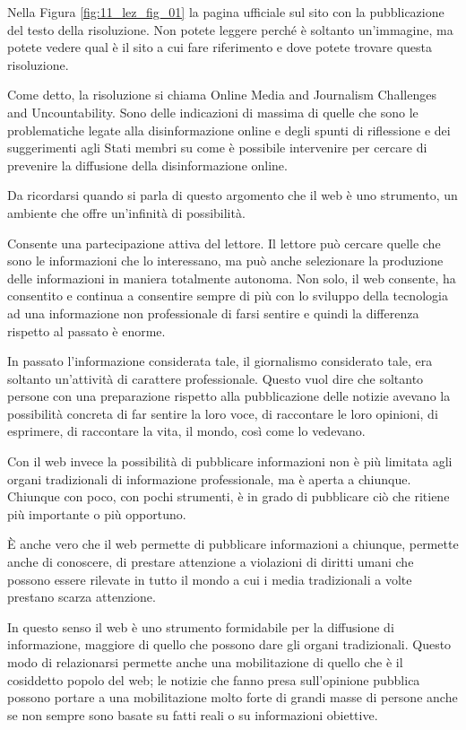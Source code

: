 Nella Figura \ref{fig:11_lez_fig_01} la pagina ufficiale sul sito con la pubblicazione del testo della risoluzione. Non potete leggere perché è soltanto un'immagine, ma potete vedere qual è il sito a cui fare riferimento e dove potete trovare questa risoluzione.

Come detto, la risoluzione si chiama Online Media and Journalism Challenges and Uncountability. Sono delle indicazioni di massima di quelle che sono le problematiche legate alla disinformazione online e degli spunti di riflessione e dei suggerimenti agli Stati membri su come è possibile intervenire per cercare di prevenire la diffusione della disinformazione online.

Da ricordarsi quando si parla di questo argomento che il web è uno strumento, un ambiente che offre un'infinità di possibilità.

Consente una partecipazione attiva del lettore. Il lettore può cercare quelle che sono le informazioni che lo interessano, ma può anche selezionare la produzione delle informazioni in maniera totalmente autonoma. Non solo, il web consente, ha consentito e continua a consentire sempre di più con lo sviluppo della tecnologia ad una informazione non professionale di farsi sentire e quindi la differenza rispetto al passato è enorme.

In passato l'informazione considerata tale, il giornalismo considerato tale, era soltanto un'attività di carattere professionale. Questo vuol dire che soltanto persone con una preparazione rispetto alla pubblicazione delle notizie avevano la possibilità concreta di far sentire la loro voce, di raccontare le loro opinioni, di esprimere, di raccontare la vita, il mondo, così come lo vedevano.

Con il web invece la possibilità di pubblicare informazioni non è più limitata agli organi tradizionali di informazione professionale, ma è aperta a chiunque. Chiunque con poco, con pochi strumenti, è in grado di pubblicare ciò che ritiene più importante o più opportuno. 

È anche vero che il web permette di pubblicare informazioni a chiunque, permette anche di conoscere, di prestare attenzione a violazioni di diritti umani che possono essere rilevate in tutto il mondo a cui i media tradizionali a volte prestano scarza attenzione. 

In questo senso il web è uno strumento formidabile per la diffusione di informazione, maggiore di quello che possono dare gli organi tradizionali. Questo modo di relazionarsi permette anche una mobilitazione di quello che è il cosiddetto popolo del web; le notizie che fanno presa sull'opinione pubblica possono portare a una mobilitazione molto forte di grandi masse di persone anche se non sempre sono basate su fatti reali o su informazioni obiettive.

